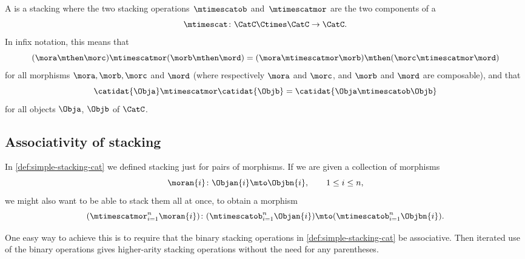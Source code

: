 \begin{ctdefinition}
    \label{def:functorial-stacking-cat}
    A  is a stacking  where the two stacking operations~$\mtimescatob$ and~$\mtimescatmor$ are the two components of a  \begin{equation}
        \mtimescat\colon \CatC \Ctimes \CatC \to \CatC.
    \end{equation}
    In infix notation, this means that
    \begin{equation}
        (\mora \mthen \morc )
        \mtimescatmor (\morb \mthen \mord )
        =
        (\mora \mtimescatmor \morb )
        \mthen (\morc \mtimescatmor \mord )
    \end{equation}
    for all morphisms $\mora, \morb, \morc$ and $\mord$ (where respectively $\mora$ and $\morc$, and $\morb$ and $\mord$ are composable), and that
    \begin{equation}\label{eq:functorial-stacking-condition-identities}
        \catidat{\Obja} \mtimescatmor \catidat{\Objb} = \catidat{\Obja \mtimescatob \Objb}
    \end{equation}
    for all objects $\Obja$, $\Objb$ of $\CatC$.
\end{ctdefinition}


\subsection{Associativity of stacking}

In \cref{def:simple-stacking-cat} we defined stacking just for pairs of morphisms.  If we are given a collection of morphisms
%
\begin{equation}
    \moran{i} \colon \Objan{i} \mto \Objbn{i}, \qquad 1 \leq i \leq n,
\end{equation}
%
we might also want to be able to stack them all at once, to obtain a morphism
%
\begin{equation}
    (\mtimescatmor_{i=1}^n \moran{i} )
    \colon( \mtimescatob_{i=1}^n \Objan{i} )\mto (\mtimescatob_{i=1}^n \Objbn{i}).
\end{equation}

One easy way to achieve this is to require that the binary stacking operations in \cref{def:simple-stacking-cat} be associative. Then iterated use of the binary operations gives higher-arity stacking operations without the need for any parentheses. 

